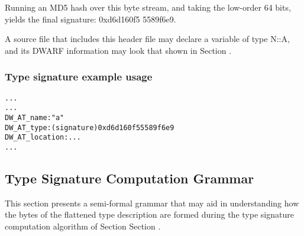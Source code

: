 Running an MD5 hash over this byte stream, and taking the
low-order 64 bits, yields the final signature: 0xd6d160f5
5589f6e9.


A source file that includes this header file may declare a
variable of type N::A, and its DWARF information may look
that shown in 
Section .


\subsubsection{Type signature example usage}
\label{app:typesignatureexampleusage}

\begin{alltt}
  ...
    ...
      DW\_AT\_name: "a"
      DW\_AT\_type: (signature) 0xd6d160f5 5589f6e9
      DW\_AT\_location: ...
    ...
\end{alltt}

\subsection{Type Signature Computation Grammar}
\label{app:typesignaturecomputationgrammar}

This section
presents a semi-formal grammar that may aid in understanding
how the bytes of the flattened type description are formed
during the type signature computation algorithm of Section
Section . 


